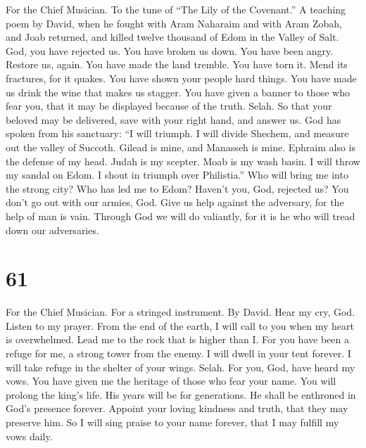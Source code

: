 For the Chief Musician. To the tune of ``The Lily of the Covenant.'' A
teaching poem by David, when he fought with Aram Naharaim and with Aram
Zobah, and Joab returned, and killed twelve thousand of Edom in the
Valley of Salt.  God, you have rejected us. You have broken
us down. You have been angry. Restore us, again.  You have
made the land tremble. You have torn it. Mend its fractures, for it
quakes.  You have shown your people hard things. You have
made us drink the wine that makes us stagger.  You have
given a banner to those who fear you, that it may be displayed because
of the truth. Selah.  So that your beloved may be delivered,
save with your right hand, and answer us.  God has spoken
from his sanctuary: ``I will triumph. I will divide Shechem, and measure
out the valley of Succoth.  Gilead is mine, and Manasseh is
mine. Ephraim also is the defense of my head. Judah is my scepter.
 Moab is my wash basin. I will throw my sandal on Edom. I
shout in triumph over Philistia.''  Who will bring me into
the strong city? Who has led me to Edom?  Haven't you, God,
rejected us? You don't go out with our armies, God.  Give
us help against the adversary, for the help of man is vain.
 Through God we will do valiantly, for it is he who will
tread down our adversaries.

\hypertarget{section-59}{%
\section{61}\label{section-59}}

For the Chief Musician. For a stringed instrument. By David.
 Hear my cry, God. Listen to my prayer.  From
the end of the earth, I will call to you when my heart is overwhelmed.
Lead me to the rock that is higher than I.  For you have
been a refuge for me, a strong tower from the enemy.  I will
dwell in your tent forever. I will take refuge in the shelter of your
wings. Selah.  For you, God, have heard my vows. You have
given me the heritage of those who fear your name.  You will
prolong the king's life. His years will be for generations. 
He shall be enthroned in God's presence forever. Appoint your loving
kindness and truth, that they may preserve him.  So I will
sing praise to your name forever, that I may fulfill my vows daily.

